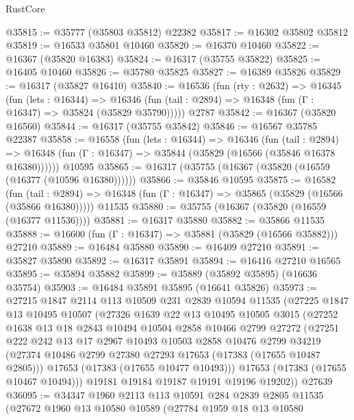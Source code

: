 \begin{lexlean}{RustCore}
\begin{coremodule}
@35815 := @35777 (@35803 @35812) @22382
@35817 := @16302 @35802 @35812
@35819 := @16533 @35801 @10460
@35820 := @16370 @10460
@35822 := @16367 (@35820 @16383)
@35824 := @16317 (@35755 @35822)
@35825 := @16405 @10460
@35826 := @35780 @35825
@35827 := @16389 @35826
@35829 := @16317 (@35827 @16410)
@35840 := @16536
    (fun (rty : @2632) =>
    @16345
      (fun (lets : @16344) =>
      @16346 (fun (tail : @2894) => @16348 (fun (Γ : @16347) => @35824 (@35829 @35790)))))
    @2787
@35842 := @16367 (@35820 @16560)
@35844 := @16317 (@35755 @35842)
@35846 := @16567 @35785 @22387
@35858 := @16558
    (fun (lets : @16344) =>
    @16346
      (fun (tail : @2894) =>
      @16348 (fun (Γ : @16347) => @35844 (@35829 (@16566 (@35846 @16378 @16380))))))
    @10595
@35865 := @16317 (@35755 (@16367 (@35820 (@16559 (@16377 (@10596 @16380))))))
@35866 := @35846 @10595
@35875 := @16582
    (fun (tail : @2894) => @16348 (fun (Γ : @16347) => @35865 (@35829 (@16566 (@35866 @16380)))))
    @11535
@35880 := @35755 (@16367 (@35820 (@16559 (@16377 @11536))))
@35881 := @16317 @35880
@35882 := @35866 @11535
@35888 := @16600 (fun (Γ : @16347) => @35881 (@35829 (@16566 @35882))) @27210
@35889 := @16484 @35880
@35890 := @16409 @27210
@35891 := @35827 @35890
@35892 := @16317 @35891
@35894 := @16416 @27210 @16565
@35895 := @35894 @35882
@35899 := @35889 (@35892 @35895) (@16636 @35754)
@35903 := @16484 @35891 @35895 (@16641 @35826)
@35973 := @27215
    @1847
    @2114
    @113
    @10509
    @231
    @2839
    @10594
    @11535
    (@27225
      @1847
      @13
      @10495
      @10507
      (@27326
        @1639
        @22
        @13
        @10495
        @10505
        @3015
        (@27252
          @1638
          @13
          @18
          @2843
          @10494
          @10504
          @2858
          @10466
          @2799
          @27272
          (@27251
            @222
            @242
            @13
            @17
            @2967
            @10493
            @10503
            @2858
            @10476
            @2799
            @34219
            (@27374 @10486 @2799 @27380 @27293 @17653 (@17383 (@17655 @10487 @2805)))
            @17653
            (@17383 (@17655 @10477 @10493)))
          @17653
          (@17383 (@17655 @10467 @10494)))
        @19181
        @19184
        @19187
        @19191
        @19196
        @19202))
    @27639
@36095 := @34347
    @1960
    @2113
    @113
    @10591
    @284
    @2839
    @2805
    @11535
    (@27672
      @1960
      @13
      @10580
      @10589
      (@27784
        @1959
        @18
        @13
        @10580

\end{coremodule}
\end{lexlean}
